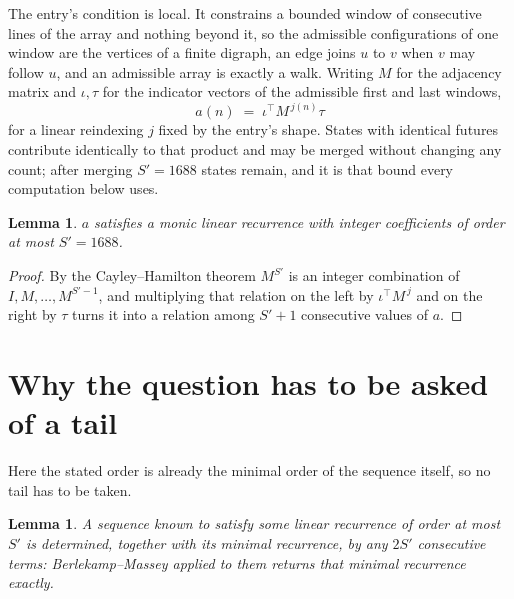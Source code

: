 \documentclass[11pt,a4paper]{article}
\theoremstyle{plain}
\newtheorem{lemma}[theorem]{Lemma}
\theoremstyle{definition}
\begin{document}
The entry's condition is local. It constrains a bounded window of consecutive lines of the
array and nothing beyond it, so the admissible configurations of one window are the vertices of
a finite digraph, an edge joins $u$ to $v$ when $v$ may follow $u$, and an admissible array is
exactly a walk. Writing $M$ for the adjacency matrix and $\iota,\tau$ for the indicator vectors
of the admissible first and last windows,
\[
a(n)\;=\;\iota^{\!\top}M^{\,j(n)}\tau
\]
for a linear reindexing $j$ fixed by the entry's shape. States with identical futures
contribute identically to that product and may be merged without changing any count; after
merging $S'=1688$ states remain, and it is that bound every computation below uses.

\begin{lemma}\label{lem:cf}
$a$ satisfies a monic linear recurrence with integer coefficients of order at most $S'=1688$.
\end{lemma}

\begin{proof}
By the Cayley--Hamilton theorem $M^{S'}$ is an integer combination of $I,M,\dots,M^{S'-1}$,
and multiplying that relation on the left by $\iota^{\!\top}M^{\,j}$ and on the right by
$\tau$ turns it into a relation among $S'+1$ consecutive values of $a$.
\end{proof}

\section{Why the question has to be asked of a tail}

Here the stated order is already the minimal order of the sequence itself, so no tail has to be taken.

\begin{lemma}\label{lem:bm}
A sequence known to satisfy some linear recurrence of order at most $S'$ is determined,
together with its minimal recurrence, by any $2S'$ consecutive terms: Berlekamp--Massey applied
to them returns that minimal recurrence exactly.
\end{lemma}
\end{document}

